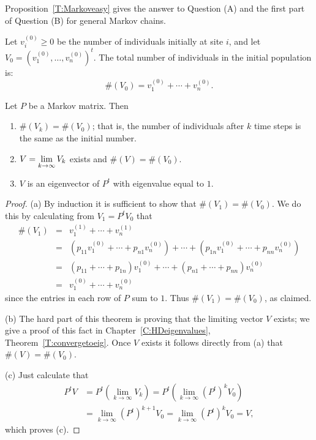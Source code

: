 \documentclass{ximera}
\begin{document}
Proposition~\ref{T:Markoveasy} gives the answer to Question (A) and the first
part of Question (B) for general Markov chains.

Let $v_i^{(0)}\ge 0$ be the number of individuals initially at site $i$, and
let $V_0=(v_1^{(0)},\ldots,v_n^{(0)})^t$.  The total number of individuals
in the initial population is:
\[
\#(V_0) = v_1^{(0)} + \cdots + v_n^{(0)}.
\]

\begin{theorem}  \label{T:Markov}
Let $P$ be a Markov matrix.  Then
\begin{enumerate}
\item[(a)]  $\#(V_k)=\#(V_0)$; that is, the number of individuals after $k$
time steps is the same as the initial number.
\item[(b)]  $\displaystyle V = \lim_{k\to\infty}V_k$ exists and $\#(V)=\#(V_0)$.
\item[(c)]  $V$ is an eigenvector of $P^t$ with eigenvalue equal to $1$.
\end{enumerate}
\end{theorem}

\begin{proof}  (a) By induction it is sufficient to show that $\#(V_1)=\#(V_0)$.  We
do
this by calculating from $V_1 = P^tV_0$ that
\begin{eqnarray*}
\#(V_1) & = & v_1^{(1)} + \cdots + v_n^{(1)}\\
& = & (p_{11}v_1^{(0)} + \cdots + p_{n1}v_n^{(0)}) + \cdots +
	(p_{1n}v_1^{(0)} + \cdots + p_{nn}v_n^{(0)}) \\
& = & (p_{11}+ \cdots + p_{1n})v_1^{(0)}  + \cdots +
	(p_{n1} + \cdots + p_{nn})v_n^{(0)} \\
& = & v_1^{(0)}  + \cdots + v_n^{(0)}
\end{eqnarray*}
since the entries in each row of $P$ sum to $1$.  Thus $\#(V_1)=\#(V_0)$, as
claimed.

(b)	The hard part of this theorem is proving that the limiting vector $V$
exists; we give a proof of this fact in Chapter~\ref{C:HDeigenvalues},
Theorem~\ref{T:convergetoeig}.  Once $V$ exists it follows directly from (a)
that $\#(V)=\#(V_0)$.

(c)   	Just calculate that
\begin{align*}
P^tV &= P^t(\lim_{k\to\infty}V_k) = P^t(\lim_{k\to\infty}(P^t)^kV_0) \\
&= \lim_{k\to\infty}(P^t)^{k+1}V_0 = \lim_{k\to\infty}(P^t)^kV_0 = V,
\end{align*}
which proves (c).   \end{proof}
\end{document}
